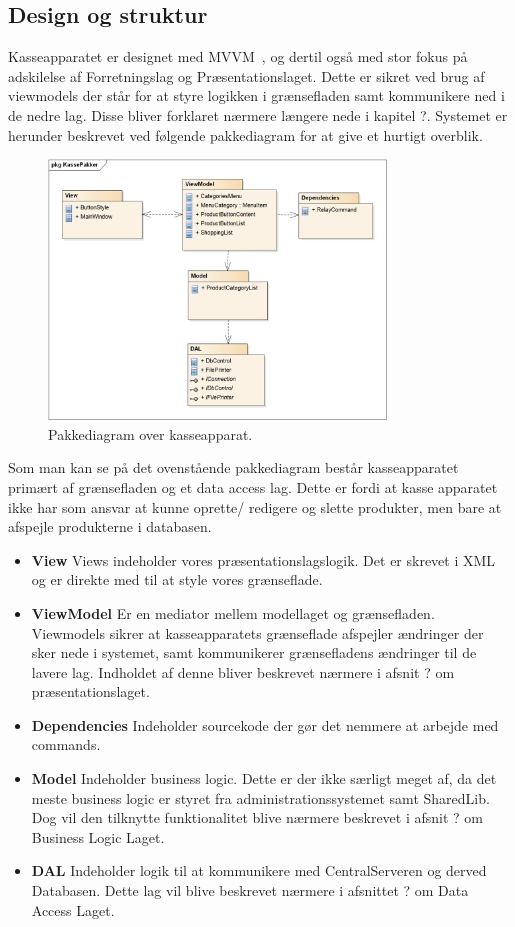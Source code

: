 \subsection{Design og struktur}
Kasseapparatet er designet med MVVM~\cite{MVVM}, og dertil også med stor fokus på adskilelse af Forretningslag og Præsentationslaget. Dette er sikret ved brug af viewmodels der står for at styre logikken i grænsefladen samt kommunikere ned i de nedre lag. Disse bliver forklaret nærmere længere nede i kapitel ?.
Systemet er herunder beskrevet ved følgende pakkediagram for at give et hurtigt overblik.	

\begin{figure}[H]
	\centering
	\includegraphics[width=0.8\textwidth]{Systemdesign/Frontend/pics/KassePakker}
	\caption{Pakkediagram over kasseapparat.}
	\label{fig:EndeligeGUI}
\end{figure}

Som man kan se på det ovenstående pakkediagram består kasseapparatet primært af grænsefladen og et data access lag. Dette er fordi at kasse apparatet ikke har som ansvar at kunne oprette/ redigere og slette produkter, men bare at afspejle produkterne i databasen. 

\begin{itemize}
	\item \textbf{View} Views indeholder vores præsentationslagslogik. Det er skrevet i XML og er direkte med til at style vores grænseflade.
	\item \textbf{ViewModel} Er en mediator mellem modellaget og grænsefladen. Viewmodels sikrer at kasseapparatets grænseflade afspejler ændringer der sker nede i systemet, samt kommunikerer grænsefladens ændringer til de lavere lag. Indholdet af denne bliver beskrevet nærmere i afsnit ? om præsentationslaget.
	\item \textbf{Dependencies} Indeholder sourcekode der gør det nemmere at arbejde med commands.
	\item \textbf{Model} Indeholder business logic. Dette er der ikke særligt meget af, da det meste business logic er styret fra administrationssystemet samt SharedLib. Dog vil den tilknytte funktionalitet blive nærmere beskrevet i afsnit ? om Business Logic Laget.
	\item \textbf{DAL} Indeholder logik til at kommunikere med CentralServeren og derved Databasen. Dette lag vil blive beskrevet nærmere i afsnittet ? om Data Access Laget.
\end{itemize}




